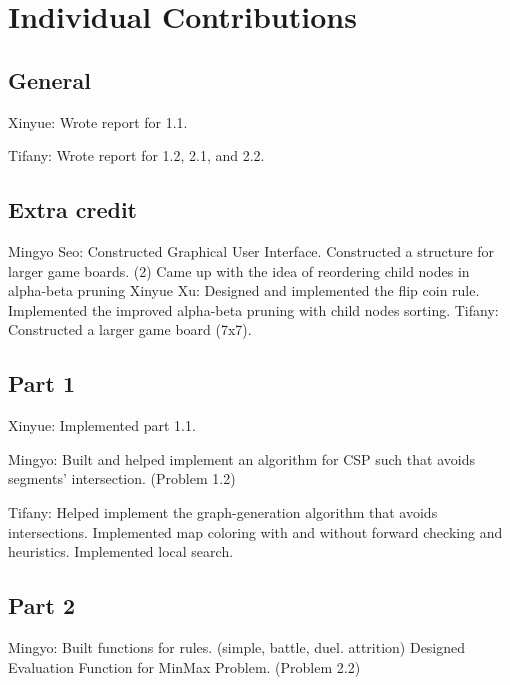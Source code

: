 \section*{Individual Contributions}
\subsection*{General}
Xinyue: Wrote report for 1.1.

Tifany: Wrote report for 1.2, 2.1, and 2.2.

\subsection*{Extra credit}
Mingyo Seo: Constructed Graphical User Interface. Constructed a structure for larger game boards. (2)
           Came up with the idea of reordering child nodes in alpha-beta pruning
Xinyue Xu: Designed and implemented the flip coin rule.\\
           Implemented the improved alpha-beta pruning with child nodes sorting.
Tifany: Constructed a larger game board (7x7).
\subsection*{Part 1}
Xinyue: Implemented part 1.1.

Mingyo: Built and helped implement an algorithm for CSP such that avoids segments' intersection. (Problem 1.2)

Tifany: Helped implement the graph-generation algorithm that avoids intersections. Implemented map coloring with and without forward checking and heuristics. Implemented local search.
\subsection*{Part 2}
Mingyo: Built functions for rules. (simple, battle, duel. attrition) Designed Evaluation Function for MinMax Problem. (Problem 2.2)
